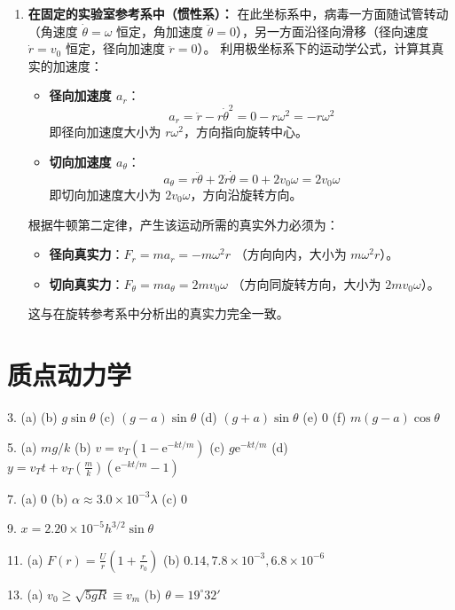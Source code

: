 \begin{solution}
\begin{enumerate}
    \item[(b)] \textbf{在固定的实验室参考系中（惯性系）：}
    在此坐标系中，病毒一方面随试管转动（角速度 $\dot{\theta} = \omega$ 恒定，角加速度 $\ddot{\theta} = 0$），另一方面沿径向滑移（径向速度 $\dot{r} = v_0$ 恒定，径向加速度 $\ddot{r} = 0$）。
    利用极坐标系下的运动学公式，计算其真实的加速度：
    \begin{itemize}
        \item \textbf{径向加速度 $a_r$}：
        $$ a_r = \ddot{r} - r\dot{\theta}^2 = 0 - r\omega^2 = -r\omega^2 $$
        即径向加速度大小为 $r\omega^2$，方向指向旋转中心。
        \item \textbf{切向加速度 $a_\theta$}：
        $$ a_\theta = r\ddot{\theta} + 2\dot{r}\dot{\theta} = 0 + 2v_0\omega = 2v_0\omega $$
        即切向加速度大小为 $2v_0\omega$，方向沿旋转方向。
    \end{itemize}
    根据牛顿第二定律，产生该运动所需的真实外力必须为：
    \begin{itemize}
        \item \textbf{径向真实力}：$F_r = m a_r = -m\omega^2 r$ （方向向内，大小为 $m\omega^2 r$）。
        \item \textbf{切向真实力}：$F_\theta = m a_\theta = 2m v_0 \omega$ （方向同旋转方向，大小为 $2m v_0 \omega$）。
    \end{itemize}
    这与在旋转参考系中分析出的真实力完全一致。
\end{enumerate}
\end{solution}

\chapter{质点动力学}

\begin{oddanswers}
3. (a) (b) $g\sin\theta$
(c) $(g - a)\sin\theta$
(d) $(g + a)\sin\theta$
(e) $0$
(f) $m(g - a)\cos\theta$

5. (a) $mg/k$
(b) $v = v_T(1 - \text{e}^{-kt/m})$
(c) $g \text{e}^{-kt/m}$
(d) $y = v_T t + v_T \left(\frac{m}{k}\right) (\text{e}^{-kt/m} - 1)$

7. (a) $0$
(b) $\alpha \approx 3.0 \times 10^{-3}\lambda$
(c) $0$

9. $x = 2.20 \times 10^{-5}h^{3/2}\sin\theta$

11. (a) $F(r) = \frac{U}{r} \left( 1 + \frac{r}{r_0} \right)$
(b) $0.14, 7.8 \times 10^{-3}, 6.8 \times 10^{-6}$

13. (a) $v_0 \ge \sqrt{5gR} \equiv v_m$
(b) $\theta = 19^\circ 32'$
\end{oddanswers}

